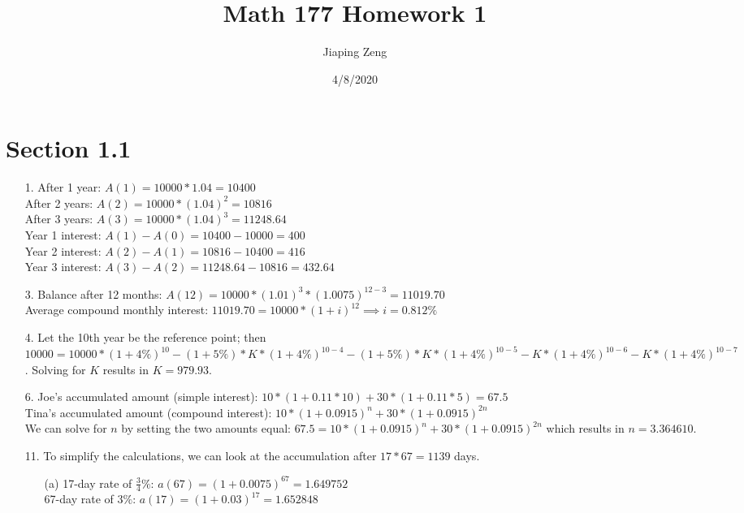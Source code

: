 \documentclass{article}
\title{Math 177 Homework 1}
\date{4/8/2020}
\author{Jiaping Zeng}
\begin{document}
\maketitle

\section*{Section 1.1}
\begin{itemize}
    \item [1.]
          After 1 year: $A(1)=10000*1.04=\boxed{10400}$\\
          After 2 years: $A(2)=10000*(1.04)^2=\boxed{10816}$\\
          After 3 years: $A(3)=10000*(1.04)^3=\boxed{11248.64}$\\
          Year 1 interest: $A(1)-A(0)=10400-10000=\boxed{400}$\\
          Year 2 interest: $A(2)-A(1)=10816-10400=\boxed{416}$\\
          Year 3 interest: $A(3)-A(2)=11248.64-10816=\boxed{432.64}$
    \item [3.]
          Balance after 12 months: $A(12)=10000*(1.01)^3*(1.0075)^{12-3}=\boxed{11019.70}$\\
          Average compound monthly interest: $11019.70=10000*(1+i)^{12} \implies \boxed{i=0.812\%}$
    \item [4.]
          Let the 10th year be the reference point; then $10000=10000*(1+4\%)^{10}-(1+5\%)*K*(1+4\%)^{10-4}-(1+5\%)*K*(1+4\%)^{10-5}-K*(1+4\%)^{10-6}-K*(1+4\%)^{10-7}$. Solving for $K$ results in $\boxed{K=979.93}$.
    \item [6.]
          Joe's accumulated amount (simple interest): $10*(1+0.11*10) + 30*(1+0.11*5)=67.5$\\
          Tina's accumulated amount (compound interest): $10*(1+0.0915)^n+30*(1+0.0915)^{2n}$\\
          We can solve for $n$ by setting the two amounts equal: $67.5=10*(1+0.0915)^n+30*(1+0.0915)^{2n}$ which results in $\boxed{n=3.364610}$.
    \item [11.]
          To simplify the calculations, we can look at the accumulation after $17*67=1139$ days.
          \begin{itemize}
              \item [(a)]
                    17-day rate of $\frac{3}{4}\%$: $a(67)=(1+0.0075)^{67}=1.649752$\\
                    67-day rate of $3\%$: $a(17)=(1+0.03)^{17}=1.652848$\\

\end{itemize}
\end{itemize}
\end{document}
